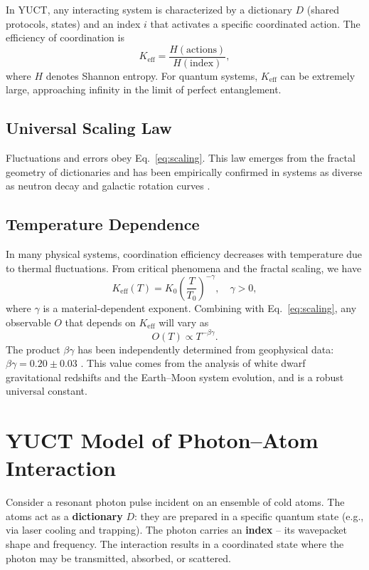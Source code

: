 \documentclass[12pt,a4paper]{article}
\newcommand{\Keff}{K_{\mathrm{eff}}}
\newcommand{\betagamma}{\beta\gamma}
\newcommand{\betac}{\beta}
\begin{document}
	In YUCT, any interacting system is characterized by a dictionary \(D\) (shared protocols, states) and an index \(i\) that activates a specific coordinated action. The efficiency of coordination is
	\begin{equation}
		\Keff = \frac{H(\text{actions})}{H(\text{index})},
	\end{equation}
	where \(H\) denotes Shannon entropy. For quantum systems, \(\Keff\) can be extremely large, approaching infinity in the limit of perfect entanglement.
	
	\subsection{Universal Scaling Law}
	
	Fluctuations and errors obey Eq.~\eqref{eq:scaling}. This law emerges from the fractal geometry of dictionaries and has been empirically confirmed in systems as diverse as neutron decay and galactic rotation curves \cite{Yakushev2026c}.
	
	\subsection{Temperature Dependence}
	
	In many physical systems, coordination efficiency decreases with temperature due to thermal fluctuations. From critical phenomena and the fractal scaling, we have
	\begin{equation}
		\Keff(T) = K_0 \left(\frac{T}{T_0}\right)^{-\gamma}, \quad \gamma > 0,
		\label{eq:K_T}
	\end{equation}
	where \(\gamma\) is a material-dependent exponent. Combining with Eq.~\eqref{eq:scaling}, any observable \(O\) that depends on \(\Keff\) will vary as
	\begin{equation}
		O(T) \propto T^{-\betac\gamma}.
	\end{equation}
	The product \(\betac\gamma\) has been independently determined from geophysical data: \(\betagamma = 0.20 \pm 0.03\) \cite{Yakushev2026b}. This value comes from the analysis of white dwarf gravitational redshifts and the Earth–Moon system evolution, and is a robust universal constant.
	
	\section{YUCT Model of Photon–Atom Interaction}
	
	Consider a resonant photon pulse incident on an ensemble of cold atoms. The atoms act as a \textbf{dictionary} \(D\): they are prepared in a specific quantum state (e.g., via laser cooling and trapping). The photon carries an \textbf{index} – its wavepacket shape and frequency. The interaction results in a coordinated state where the photon may be transmitted, absorbed, or scattered.
	
\end{document}
